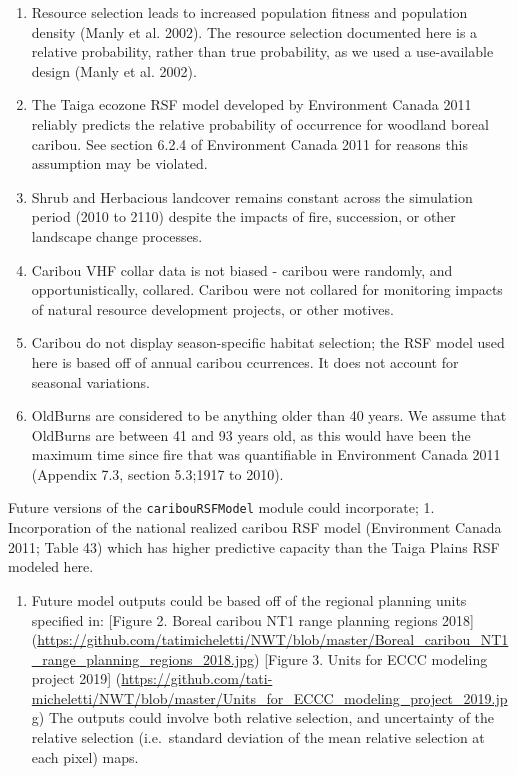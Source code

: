 \documentclass[]{article}
\providecommand{\tightlist}{%
  \setlength{\itemsep}{0pt}\setlength{\parskip}{0pt}}
\begin{document}
\begin{enumerate}
\def\labelenumi{\arabic{enumi}.}
\setcounter{enumi}{1}
\item
  Resource selection leads to increased population fitness and
  population density (Manly et al. 2002). The resource selection
  documented here is a relative probability, rather than true
  probability, as we used a use-available design (Manly et al. 2002).
\item
  The Taiga ecozone RSF model developed by Environment Canada 2011
  reliably predicts the relative probability of occurrence for woodland
  boreal caribou. See section 6.2.4 of Environment Canada 2011 for
  reasons this assumption may be violated.
\item
  Shrub and Herbacious landcover remains constant across the simulation
  period (2010 to 2110) despite the impacts of fire, succession, or
  other landscape change processes.
\item
  Caribou VHF collar data is not biased - caribou were randomly, and
  opportunistically, collared. Caribou were not collared for monitoring
  impacts of natural resource development projects, or other motives.
\item
  Caribou do not display season-specific habitat selection; the RSF
  model used here is based off of annual caribou ccurrences. It does not
  account for seasonal variations.
\item
  OldBurns are considered to be anything older than 40 years. We assume
  that OldBurns are between 41 and 93 years old, as this would have been
  the maximum time since fire that was quantifiable in Environment
  Canada 2011 (Appendix 7.3, section 5.3;1917 to 2010).
\end{enumerate}

Future versions of the \texttt{caribouRSFModel} module could
incorporate; 1. Incorporation of the national realized caribou RSF model
(Environment Canada 2011; Table 43) which has higher predictive capacity
than the Taiga Plains RSF modeled here.

\begin{enumerate}
\def\labelenumi{\arabic{enumi}.}
\setcounter{enumi}{1}
\tightlist
\item
  Future model outputs could be based off of the regional planning units
  specified in: {[}Figure 2. Boreal caribou NT1 range planning regions
  2018{]}
  (\url{https://github.com/tatimicheletti/NWT/blob/master/Boreal_caribou_NT1_range_planning_regions_2018.jpg})
  {[}Figure 3. Units for ECCC modeling project 2019{]}
  (\url{https://github.com/tati-micheletti/NWT/blob/master/Units_for_ECCC_modeling_project_2019.jpg})
  The outputs could involve both relative selection, and uncertainty of
  the relative selection (i.e.~standard deviation of the mean relative
  selection at each pixel) maps.
\end{enumerate}
\end{document}

